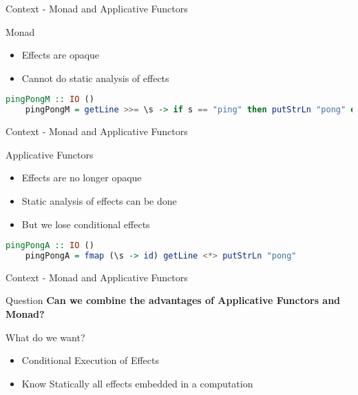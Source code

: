 \documentclass{beamer}
\begin{document}
\begin{frame}[fragile]{Context - Monad and Applicative Functors}

  \begin{block}{Monad}
    \begin{itemize}
      \item Effects are opaque
      \item Cannot do static analysis of effects
    \end{itemize}
  \end{block}

\begin{lstlisting}[language=Haskell]
    pingPongM :: IO ()
    pingPongM = getLine >>= \s -> if s == "ping" then putStrLn "pong" else return ()
\end{lstlisting}
\end{frame}

\begin{frame}[fragile]{Context - Monad and Applicative Functors}

  \begin{block}{Applicative Functors}
    \begin{itemize}
    \item Effects are no longer opaque
    \item Static analysis of effects can be done
    \item But we lose conditional effects
    \end{itemize}
  \end{block}

\begin{lstlisting}[language=Haskell]
    pingPongA :: IO ()
    pingPongA = fmap (\s -> id) getLine <*> putStrLn "pong"
\end{lstlisting}

\end{frame}

\begin{frame}[fragile]{Context - Monad and Applicative Functors}

  \begin{block}{Question}
    \textbf{Can we combine the advantages of Applicative Functors and Monad?}
  \end{block}

  \begin{block}{What do we want?}
    \begin{itemize}
     \item Conditional Execution of Effects
     \item Know Statically all effects embedded in a computation
    \end{itemize}
  \end{block}

\end{frame}
\end{document}
